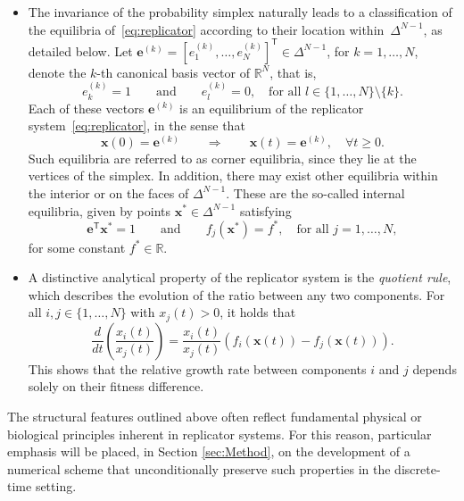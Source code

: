 \documentclass[11pt,letterpaper]{article}
\theoremstyle{remark}
\begin{document}
\begin{itemize}
    \item The invariance of the probability simplex naturally leads to a classification of the equilibria of~\eqref{eq:replicator} according to their location within~$\Delta^{N-1}$, as detailed below.
    Let $\bm{e}^{(k)} = [e_1^{(k)}, \dots, e_N^{(k)}]^\mathsf{T} \in \Delta^{N-1}$, for $k = 1,\dots,N$, denote the $k$-th canonical basis vector of $\mathbb{R}^N$, that is,
    \begin{equation}\label{eq:e_i-Def}
        e_k^{(k)} = 1 \qquad \text{and} \qquad e_l^{(k)} = 0, \quad \text{for all } l \in \{1,\dots,N\} \setminus \{k\}.
    \end{equation}
    Each of these vectors $\bm{e}^{(k)}$ is an equilibrium of the replicator system~\eqref{eq:replicator}, in the sense that
    \begin{equation}\label{eq:equilibria_properties}
        \bm{x}(0) = \bm{e}^{(k)} \qquad \Longrightarrow \qquad \bm{x}(t) = \bm{e}^{(k)}, \quad \forall t \geq 0.
    \end{equation}
    Such equilibria are referred to as corner equilibria, since they lie at the vertices of the simplex.
    In addition, there may exist other equilibria within the interior or on the faces of $\Delta^{N-1}$. These are the so-called internal equilibria, given by points $\bm{x}^* \in \Delta^{N-1}$ satisfying
    \begin{equation}\label{eq:inter_equilibria_properties}
        \bm{e}^\mathsf{T} \bm{x}^* = 1 \qquad \text{and} \qquad f_j(\bm{x}^*) = f^*, \quad \text{for all } j = 1,\dots,N,
    \end{equation}
    for some constant $f^* \in \mathbb{R}$.
    
    \item A distinctive analytical property of the replicator system is the \emph{quotient rule}, which describes the evolution of the ratio between any two components. For all $i,j \in \{1,\dots,N\}$ with $x_j(t) > 0$, it holds that
    \begin{equation}\label{eq:quotient_rule}
        \frac{d}{dt} \left( \frac{x_i(t)}{x_j(t)} \right) = \frac{x_i(t)}{x_j(t)} \left( f_i(\bm{x}(t)) - f_j(\bm{x}(t)) \right).
    \end{equation}
    This shows that the relative growth rate between components $i$ and $j$ depends solely on their fitness difference.
\end{itemize}

The structural features outlined above often reflect fundamental physical or biological principles inherent in replicator systems. For this reason, particular emphasis will be placed, in Section \ref{sec:Method}, on the development of a numerical scheme that unconditionally preserve such properties in the discrete-time setting.
\end{document}
